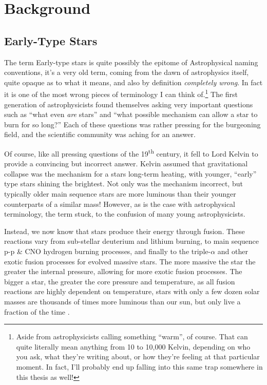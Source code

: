 \chapter{Background}

\section{Early-Type Stars}
\label{sec:earlytype}

The term Early-type stars is quite possibly the epitome of Astrophysical naming conventions, it's a very old term, coming from the dawn of astrophysics itself, quite opaque as to what it means, and also by definition \textit{completely wrong}. In fact it is one of the most wrong pieces of terminology I can think of.\footnote{Aside from astrophysicists calling something ``warm'', of course. That can quite literally mean anything from 10 to 10,000 Kelvin, depending on who you ask, what they're writing about, or how they're feeling at that particular moment. In fact, I'll probably end up falling into this same trap somewhere in this thesis as well!}
The first generation of astrophysicists found themselves asking very important questions such as ``what even \textit{are} stars'' and ``what possible mechanism can allow a star to burn for so long?'' Each of these questions was rather pressing for the burgeoning field, and the scientific community was aching for an answer.

Of course, like all pressing questions of the 19\textsuperscript{th} century, it fell to Lord Kelvin to provide a convincing but incorrect answer. Kelvin assumed that gravitational collapse was the mechanism for a stars long-term heating, with younger, ``early'' type stars shining the brightest. Not only was the mechanism incorrect, but typically older main sequence stars are more luminous than their younger counterparts of a similar mass! However, as is the case with astrophysical terminology, the term stuck, to the confusion of many young astrophysicists.


Instead, we now know that stars produce their energy through fusion. These reactions vary from sub-stellar deuterium and lithium burning, to main sequence p-p \& CNO hydrogen burning processes, and finally to the triple-$\alpha$ and other exotic fusion processes for evolved massive stars. The more massive the star the greater the internal pressure, allowing for more exotic fusion processes.
The bigger a star, the greater the core pressure and temperature, as all fusion reactions are highly dependent on temperature, stars with only a few dozen solar masses are thousands of times more luminous than our sun, but only live a fraction of the time \parencite{carrollIntroductionModernAstrophysics2014}.

